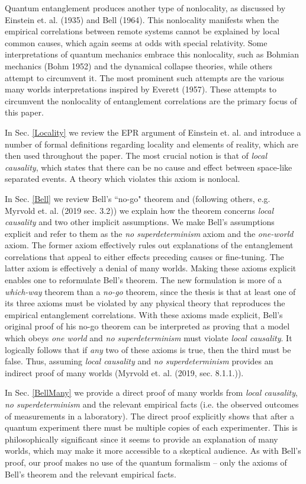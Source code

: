 \documentclass[12pt]{article}
\begin{document}
Quantum entanglement produces another type of nonlocality, as discussed by Einstein et. al. (1935) and Bell (1964). This nonlocality manifests when the empirical correlations between remote systems cannot be explained by local common causes, which again seems at odds with special relativity. Some interpretations of quantum mechanics embrace this nonlocality, such as Bohmian mechanics (Bohm 1952) and the dynamical collapse theories, while others attempt to circumvent it. The most prominent such attempts are the various many worlds interpretations inspired by Everett (1957). These attempts to circumvent the nonlocality of entanglement correlations are the primary focus of this paper.

In Sec. \ref{Locality} we review the EPR argument of Einstein et. al. and introduce a number of formal definitions regarding locality and elements of reality, which are then used throughout the paper. The most crucial notion is that of \textit{local causality}, which states that there can be no cause and effect between space-like separated events. A theory which violates this axiom is nonlocal.

In Sec. \ref{Bell} we review Bell's ``no-go" theorem and (following others, e.g. Myrvold et. al. (2019 sec. 3.2)) we explain how the theorem concerns \textit{local causality} and two other implicit assumptions. We make Bell's assumptions explicit and refer to them as the \textit{no superdeterminism} axiom and the \textit{one-world} axiom. The former axiom effectively rules out explanations of the entanglement correlations that appeal to either effects preceding causes or fine-tuning. The latter axiom is effectively a denial of many worlds. Making these axioms explicit enables one to reformulate Bell's theorem. The new formulation is more of a \textit{which-way} theorem than a \textit{no-go} theorem, since the thesis is that at least one of its three axioms must be violated by any physical theory that reproduces the empirical entanglement correlations. With these axioms made explicit, Bell's original proof of his no-go theorem can be interpreted as proving that a model which obeys \textit{one world} and \textit{no superdeterminism} must violate \textit{local causality}. It logically follows that if \textit{any} two of these axioms is true, then the third must be false. Thus, assuming \textit{local causality} and \textit{no superdeterminism} provides an indirect proof of many worlds (Myrvold et. al. (2019, sec. 8.1.1.)).

In Sec. \ref{BellMany} we provide a direct proof of many worlds from \textit{local causality}, \textit{no superdeterminism} and the relevant empirical facts (i.e. the observed outcomes of measurements in a laboratory). The direct proof explicitly shows that after a quantum experiment there must be multiple copies of each experimenter. This is philosophically significant since it seems to provide an explanation of many worlds, which may make it more accessible to a skeptical audience. As with Bell's proof, our proof makes no use of the quantum formalism -- only the axioms of Bell's theorem and the relevant empirical facts.
\end{document}
